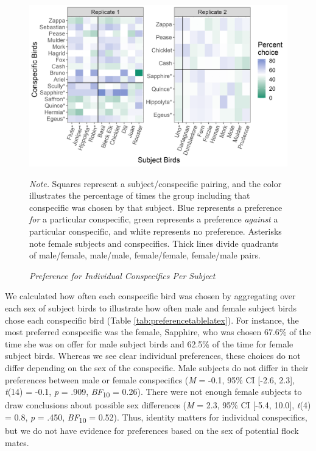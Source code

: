 \documentclass[
  ,pub,floatsintext]{apa6}
\begin{document}
\begin{figure}[t]
\caption{\newline \emph{Preference for Individual Conspecifics Per Subject} \label{fig:individualpref}}
\begin{center}
\includegraphics[width=\linewidth]{"figures/individual_preference.png"}
\end{center}

\textit{Note.} Squares represent a subject/conspecific pairing, and the color illustrates the percentage of times the group including that conspecific was chosen by that subject. Blue represents a preference \emph{for} a particular conspecific, green represents a preference \emph{against} a particular conspecific, and white represents no preference. Asterisks note female subjects and conspecifics. Thick lines divide quadrants of male/female, male/male, female/female, female/male pairs.
\end{figure}

We calculated how often each conspecific bird was chosen by aggregating over each sex of subject birds to illustrate how often male and female subject birds chose each conspecific bird (Table \ref{tab:preferencetablelatex}). For instance, the most preferred conspecific was the female, Sapphire, who was chosen 67.6\% of the time she was on offer for male subject birds and 62.5\% of the time for female subject birds. Whereas we see clear individual preferences, these choices do not differ depending on the sex of the conspecific. Male subjects do not differ in their preferences between male or female conspecifics (\emph{M} = -0.1, 95\% CI {[}-2.6, 2.3{]}, \emph{t}(14) = -0.1, \emph{p} = .909, \emph{BF}\textsubscript{10} = 0.26). There were not enough female subjects to draw conclusions about possible sex differences (\emph{M} = 2.3, 95\% CI {[}-5.4, 10.0{]}, \emph{t}(4) = 0.8, \emph{p} = .450, \emph{BF}\textsubscript{10} = 0.52). Thus, identity matters for individual conspecifics, but we do not have evidence for preferences based on the sex of potential flock mates.
\end{document}
